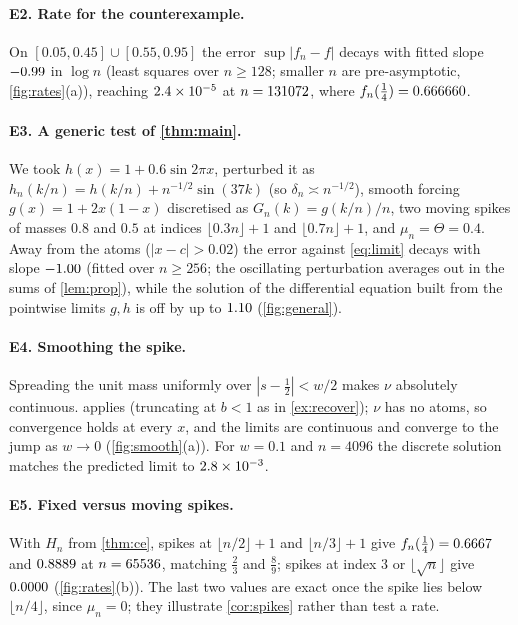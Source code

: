 \documentclass[11pt]{article}
\theoremstyle{definition}
\theoremstyle{remark}
\newcommand{\1}{\mathbf{1}}
\newcommand{\fl}[1]{\lfloor #1\rfloor}
\begin{document}
\paragraph{E2. Rate for the counterexample.} On $[0.05,0.45]\cup[0.55,0.95]$ the error
$\sup|f_n-f|$ decays with fitted slope $-0.99$ in $\log n$ (least squares over $n\ge128$;
smaller $n$ are pre-asymptotic, \cref{fig:rates}(a)), reaching
$2.4\times10^{-5}$ at $n=131072$, where $f_n(\frac14)=0.666660$.

\paragraph{E3. A generic test of \cref{thm:main}.} We took $h(x)=1+0.6\sin 2\pi x$,
perturbed it as $h_n(k/n)=h(k/n)+n^{-1/2}\sin(37k)$ (so $\delta_n\asymp n^{-1/2}$), smooth
forcing $g(x)=1+2x(1-x)$ discretised as $G_n(k)=g(k/n)/n$, two moving spikes of masses $0.8$ and
$0.5$ at indices $\fl{0.3n}+1$ and $\fl{0.7n}+1$, and $\mu_n=\Theta=0.4$. Away from the atoms
($|x-c|>0.02$) the error against \eqref{eq:limit} decays with slope $-1.00$ (fitted over
$n\ge256$; the oscillating
perturbation averages out in the sums of \cref{lem:prop}), while the solution of the
differential equation built from the pointwise limits $g,h$ is off by up to $1.10$
(\cref{fig:general}).

\paragraph{E4. Smoothing the spike.} Spreading the unit mass uniformly over $|s-\frac12|<w/2$
makes $\nu$ absolutely continuous.  applies (truncating at $b<1$ as in
\cref{ex:recover}); $\nu$ has no atoms, so convergence holds at every $x$, and the limits are
continuous and converge to the jump as $w\to0$ (\cref{fig:smooth}(a)). For $w=0.1$ and $n=4096$ the discrete
solution matches the predicted limit to $2.8\times10^{-3}$.

\paragraph{E5. Fixed versus moving spikes.} With $H_n$ from \cref{thm:ce}, spikes at
$\fl{n/2}+1$ and $\fl{n/3}+1$ give $f_n(\frac14)=0.6667$ and $0.8889$ at $n=65536$,
matching $\frac23$ and $\frac89$; spikes at index $3$ or $\fl{\sqrt n}$ give $0.0000$
(\cref{fig:rates}(b)). The last two values are exact once the spike lies below $\fl{n/4}$, since
$\mu_n=0$; they illustrate \cref{cor:spikes} rather than test a rate.
\end{document}
